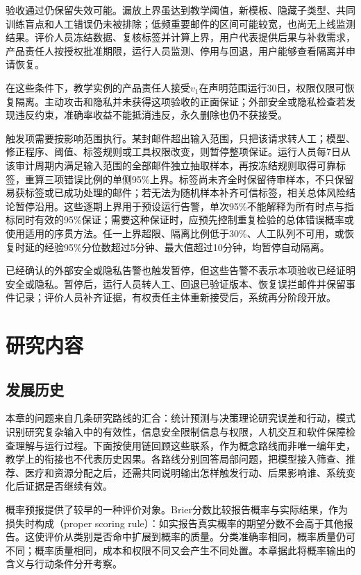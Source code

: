 验收通过仍保留失效可能。漏放上界虽达到教学阈值，新模板、隐藏子类型、共同训练盲点和人工错误仍未被排除；低频重要邮件的区间可能较宽，也尚无上线监测结果。评价人员冻结数据、复核标签并计算上界，用户代表提供后果与补救需求，产品责任人按授权批准期限，运行人员监测、停用与回退，用户能够查看隔离并申请恢复。

在这些条件下，教学实例的产品责任人接受$v_1$在声明范围运行30日，权限仅限可恢复隔离。主动攻击和隐私并未获得这项验收的正面保证；外部安全或隐私检查若发现违反约束，准确率收益不能抵消违反，永久删除也仍不获接受。

触发项需要按影响范围执行。某封邮件超出输入范围，只把该请求转人工；模型、修正程序、阈值、标签规则或工具权限改变，则暂停整项保证。运行人员每7日从该审计周期内满足输入范围的全部邮件独立抽取样本，再按冻结规则取得可靠标签，重算三项错误比例的单侧95\%上界。标签尚未齐全时保留待审样本，不只保留易获标签或已成功处理的邮件；若无法为随机样本补齐可信标签，相关总体风险结论暂停沿用。这些逐期上界用于预设运行告警，单次95\%不能解释为所有时点与指标同时有效的95\%保证；需要这种保证时，应预先控制重复检验的总体错误概率或使用适用的序贯方法。任一上界超限、隔离比例低于30\%、人工队列不可用，或恢复时延的经验95\%分位数超过5分钟、最大值超过10分钟，均暂停自动隔离。

已经确认的外部安全或隐私告警也触发暂停，但这些告警不表示本项验收已经证明安全或隐私。暂停后，运行人员转人工、回退已验证版本、恢复误拦邮件并保留事件记录；评价人员补齐证据，有权责任主体重新接受后，系统再分阶段开放。

\section{研究内容}
\label{sec:trust-research-content}

\subsection{发展历史}

本章的问题来自几条研究路线的汇合：统计预测与决策理论研究误差和行动，模式识别研究复杂输入中的有效性，信息安全限制信息与权限，人机交互和软件保障检查理解与运行过程。下面按使用链回顾这些联系，作为概念路线而非唯一编年史，教学上的衔接也不代表历史因果。各路线分别回答局部问题，把模型接入筛查、推荐、医疗和资源分配之后，还需共同说明输出怎样触发行动、后果影响谁、系统变化后证据是否继续有效。

概率预报提供了较早的一种评价对象。Brier分数比较报告概率与实际结果，作为损失时构成（proper scoring rule）：如实报告真实概率的期望分数不会高于其他报告。这使评价从类别是否命中扩展到概率的质量。分类准确率相同，概率质量仍可不同；概率质量相同，成本和权限不同又会产生不同处置。本章据此将概率输出的含义与行动条件分开考察。

